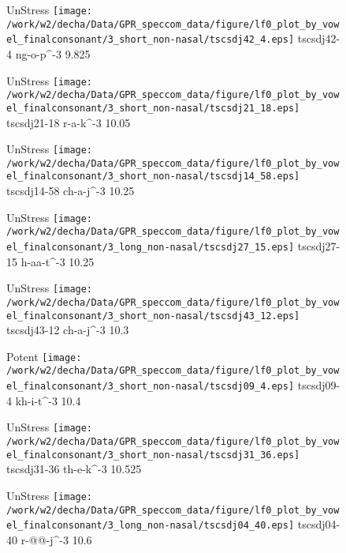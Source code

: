 \documentclass{article}
\begin{document}
\begin{figure}[t]
\begin{minipage}[b]{.24\textwidth}
UnStress
\centering
\texttt{[image: /work/w2/decha/Data/GPR\_speccom\_data/figure/lf0\_plot\_by\_vowel\_finalconsonant/3\_short\_non-nasal/tscsdj42\_4.eps]}
tscsdj42-4 ng-o-p\textasciicircum-3 9.825
\end{minipage}
\begin{minipage}[b]{.24\textwidth}
UnStress
\centering
\texttt{[image: /work/w2/decha/Data/GPR\_speccom\_data/figure/lf0\_plot\_by\_vowel\_finalconsonant/3\_short\_non-nasal/tscsdj21\_18.eps]}
tscsdj21-18 r-a-k\textasciicircum-3 10.05
\end{minipage}
\begin{minipage}[b]{.24\textwidth}
UnStress
\centering
\texttt{[image: /work/w2/decha/Data/GPR\_speccom\_data/figure/lf0\_plot\_by\_vowel\_finalconsonant/3\_short\_non-nasal/tscsdj14\_58.eps]}
tscsdj14-58 ch-a-j\textasciicircum-3 10.25
\end{minipage}
\begin{minipage}[b]{.24\textwidth}
UnStress
\centering
\texttt{[image: /work/w2/decha/Data/GPR\_speccom\_data/figure/lf0\_plot\_by\_vowel\_finalconsonant/3\_long\_non-nasal/tscsdj27\_15.eps]}
tscsdj27-15 h-aa-t\textasciicircum-3 10.25
\end{minipage}
\end{figure}
\clearpage
\begin{figure}[t]
\begin{minipage}[b]{.24\textwidth}
UnStress
\centering
\texttt{[image: /work/w2/decha/Data/GPR\_speccom\_data/figure/lf0\_plot\_by\_vowel\_finalconsonant/3\_short\_non-nasal/tscsdj43\_12.eps]}
tscsdj43-12 ch-a-j\textasciicircum-3 10.3
\end{minipage}
\begin{minipage}[b]{.24\textwidth}
\colorbox{Apricot}{Potent}
\centering
\texttt{[image: /work/w2/decha/Data/GPR\_speccom\_data/figure/lf0\_plot\_by\_vowel\_finalconsonant/3\_short\_non-nasal/tscsdj09\_4.eps]}
tscsdj09-4 kh-i-t\textasciicircum-3 10.4
\end{minipage}
\begin{minipage}[b]{.24\textwidth}
UnStress
\centering
\texttt{[image: /work/w2/decha/Data/GPR\_speccom\_data/figure/lf0\_plot\_by\_vowel\_finalconsonant/3\_short\_non-nasal/tscsdj31\_36.eps]}
tscsdj31-36 th-e-k\textasciicircum-3 10.525
\end{minipage}
\begin{minipage}[b]{.24\textwidth}
UnStress
\centering
\texttt{[image: /work/w2/decha/Data/GPR\_speccom\_data/figure/lf0\_plot\_by\_vowel\_finalconsonant/3\_long\_non-nasal/tscsdj04\_40.eps]}
tscsdj04-40 r-@@-j\textasciicircum-3 10.6
\end{minipage}
\end{figure}
\end{document}
